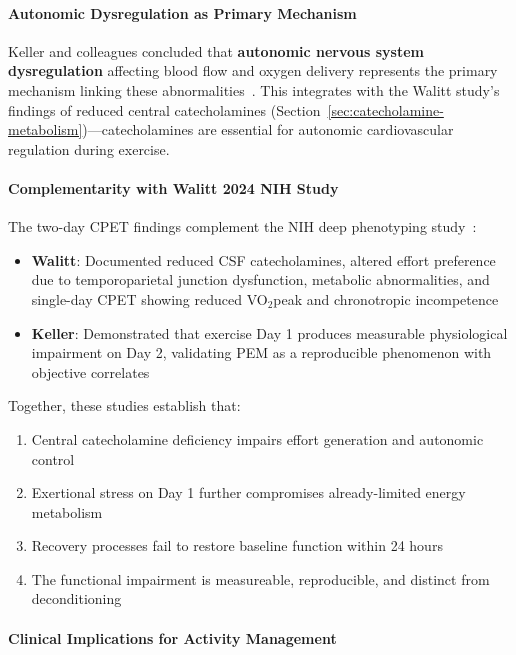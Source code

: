\paragraph{Autonomic Dysregulation as Primary Mechanism}

Keller and colleagues concluded that \textbf{autonomic nervous system dysregulation} affecting blood flow and oxygen delivery represents the primary mechanism linking these abnormalities~\cite{keller2024cpet}. This integrates with the Walitt study's findings of reduced central catecholamines (Section~\ref{sec:catecholamine-metabolism})---catecholamines are essential for autonomic cardiovascular regulation during exercise.

\paragraph{Complementarity with Walitt 2024 NIH Study}

The two-day CPET findings complement the NIH deep phenotyping study~\cite{walitt2024deep}:

\begin{itemize}
    \item \textbf{Walitt}: Documented reduced CSF catecholamines, altered effort preference due to temporoparietal junction dysfunction, metabolic abnormalities, and single-day CPET showing reduced VO$_2$peak and chronotropic incompetence
    \item \textbf{Keller}: Demonstrated that exercise Day 1 produces measurable physiological impairment on Day 2, validating PEM as a reproducible phenomenon with objective correlates
\end{itemize}

Together, these studies establish that:
\begin{enumerate}
    \item Central catecholamine deficiency impairs effort generation and autonomic control
    \item Exertional stress on Day 1 further compromises already-limited energy metabolism
    \item Recovery processes fail to restore baseline function within 24 hours
    \item The functional impairment is measureable, reproducible, and distinct from deconditioning
\end{enumerate}

\paragraph{Clinical Implications for Activity Management}

